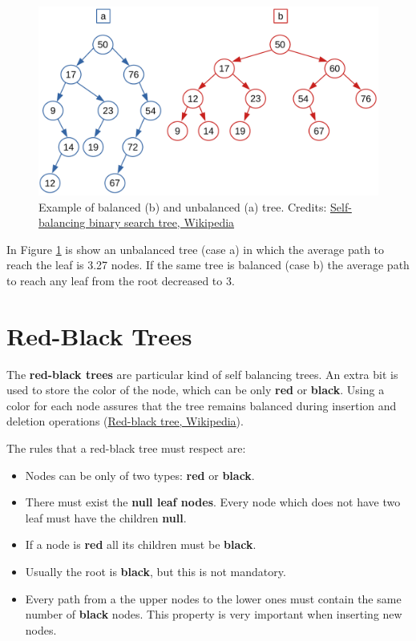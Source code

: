 \begin{figure}[H]
	\begin{center}
		\includegraphics[scale=.6]{chapters/trees/images/trees_19.pdf}
		\caption[Example of balanced (b) and unbalanced (a) tree.]{Example of balanced (b) and unbalanced (a) tree. Credits: \href{https://en.wikipedia.org/wiki/Self-balancing_binary_search_tree}{Self-balancing binary search tree, Wikipedia}}
		\label{trees_19}
	\end{center}
\end{figure}

In Figure \ref{trees_19} is show an unbalanced tree (case a) in which the average path to reach the leaf is 3.27 nodes. If the same tree is balanced (case b) the average path to reach any leaf from the root decreased to 3.

\section{Red-Black Trees}
The \textbf{red-black trees} are particular kind of self balancing trees. An extra bit is used to store the color of the node, which can be only \textbf{red} or \textbf{black}. Using a color for each node assures that the tree remains balanced during insertion and deletion operations \cite{wikiblackred} (\href{https://en.wikipedia.org/wiki/Red%E2%80%93black_tree}{Red-black tree, Wikipedia}).

The rules that a red-black tree must respect are:
\begin{itemize}
\item[1] Nodes can be only of two types: \textbf{red} or \textbf{black}.
\item[2] There must exist the \textbf{null leaf nodes}. Every node which does not have two leaf must have the children \textbf{null}.
\item[3] If a node is \textbf{red} all its children must be \textbf{black}.
\item[4] Usually the root is \textbf{black}, but this is not mandatory.
\item[5] Every path from a the upper nodes to the lower ones must contain the same number of \textbf{black} nodes. This property is very important when inserting new nodes.
\end{itemize}

